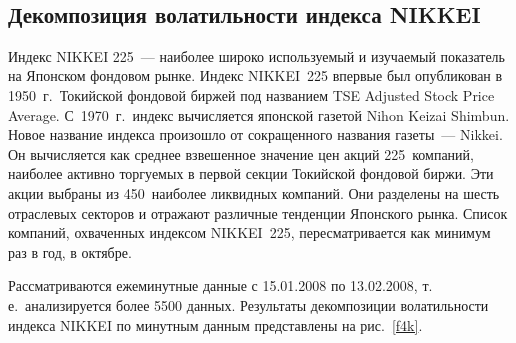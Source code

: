 \begin{multicols}{2}
\begin{figure*} %
\vspace*{1pt}
\begin{center}
\mbox{%
\epsfxsize=104.223mm
}
\end{center}
\vspace*{-9pt}
\end{figure*}


\subsection{Декомпозиция волатильности индекса NIKKEI}

Индекс NIKKEI 225~--- наиболее широко используемый и изучаемый
показатель на Японском фондовом рынке. Индекс NIKKEI~225 впервые
был опубликован в 1950~г.\ Токийской фондовой биржей под
названием TSE Adjusted Stock Price Average. С~1970~г.\ индекс
вычисляется японской газетой Nihon Keizai Shimbun. Новое название
индекса произошло от сокращенного названия газеты~--- Nikkei. Он
вычисляется как среднее взвешенное значение цен акций 225~компаний,
наиболее активно торгуемых в первой секции Токийской
фондовой биржи. Эти акции выбраны из 450~наиболее ликвидных
компаний. Они разделены на шесть отраслевых секторов и отражают
различные тенденции Японского рынка. Список компаний, охваченных
индексом NIKKEI~225, пересматривается как минимум раз в год, в
октябре.

Рассматриваются ежеминутные данные с 15.01.2008 по 13.02.2008, т.\,е.\
анализируется более 5500 данных. Результаты декомпозиции
волатильности индекса NIKKEI по минутным данным представлены на
рис.~\ref{f4k}.


\end{multicols}
